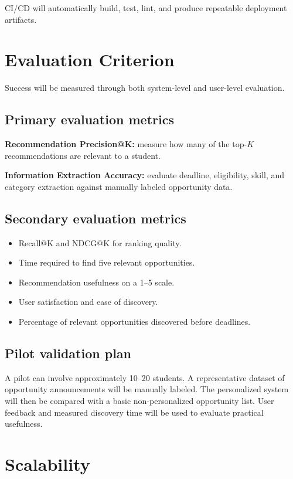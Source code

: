 \documentclass[11pt,a4paper]{article}
\begin{document}
CI/CD will automatically build, test, lint, and produce repeatable deployment artifacts.

\section{Evaluation Criterion}

Success will be measured through both system-level and user-level evaluation.

\subsection{Primary evaluation metrics}

\textbf{Recommendation Precision@K:} measure how many of the top-$K$ recommendations are relevant to a student.

\textbf{Information Extraction Accuracy:} evaluate deadline, eligibility, skill, and category extraction against manually labeled opportunity data.

\subsection{Secondary evaluation metrics}

\begin{itemize}
\item Recall@K and NDCG@K for ranking quality.
\item Time required to find five relevant opportunities.
\item Recommendation usefulness on a 1--5 scale.
\item User satisfaction and ease of discovery.
\item Percentage of relevant opportunities discovered before deadlines.
\end{itemize}

\subsection{Pilot validation plan}

A pilot can involve approximately 10--20 students. A representative dataset of opportunity announcements will be manually labeled. The personalized system will then be compared with a basic non-personalized opportunity list. User feedback and measured discovery time will be used to evaluate practical usefulness.

\section{Scalability}
\end{document}

